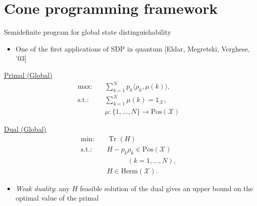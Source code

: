 \documentclass{beamer}
\def\I{\mathds{1}}
\newcommand{\ip}[2]{\langle #1 , #2\rangle}
\newcommand{\tr}{\operatorname{Tr}}
\def\X{\mathcal{X}}
\newcommand{\setft}[1]{\mathrm{#1}}
\newcommand{\Pos}{\setft{Pos}}
\newcommand{\Herm}{\setft{Herm}}
\begin{document}
  \section{Cone programming framework}

    \begin{frame}[t]{Semidefinite program for global state distinguishability}
        \begin{itemize}
          \item One of the first applications of SDP in quantum [Eldar, Megretski, Verghese, '03]
        \end{itemize}
        \vspace{10pt}
        \begin{minipage}[t]{0.48\linewidth}
            \begin{center}
            \underline{Primal (Global)}
            \begin{equation*}
              \begin{split}
                \text{max:} \quad & 
                \sum_{k=1}^{N} p_{k}\ip{\rho_{k}}{\mu(k)},\\
                \text{s.t.:} \quad & \sum_{k=1}^{N} \mu(k) = \I_{\X},\\
                  & \mu : \{1,\ldots, N\}\rightarrow \Pos(\X)
              \end{split}
            \end{equation*}
            \end{center}
        \end{minipage}\hfill
        \begin{minipage}[t]{0.48\linewidth}
            \begin{center}
            \underline{Dual (Global)}
            \vspace{10pt}
            \begin{equation*}
              \label{eq:global-dual-problem}
              \begin{split}
                \text{min:} \quad & \tr(H)\\
                \text{s.t.:} \quad & H-p_k\rho_k \in \Pos(\X)\\
                & \quad\qquad(k = 1,\ldots,N),\\
                \quad & H \in \Herm(\X).
              \end{split}
            \end{equation*}
            \end{center}
        \end{minipage}
        \vspace{10pt}
        \begin{itemize}
          \item \emph{Weak duality}: any $H$ feasible solution of the dual gives
            an upper bound on the optimal value of the primal  
        \end{itemize}
    \end{frame}
\end{document}
